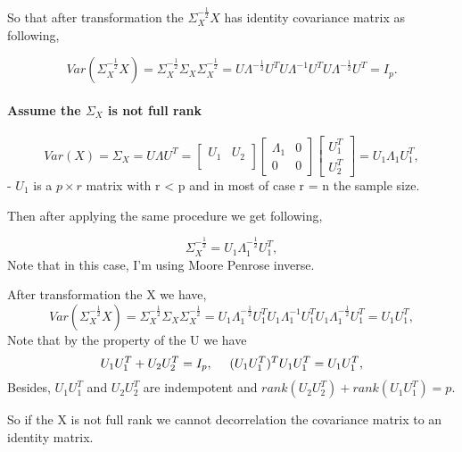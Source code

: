 \documentclass[]{article}
\let\oldparagraph\paragraph
\renewcommand{\paragraph}[1]{\oldparagraph{#1}\mbox{}}
\begin{document}
So that after transformation the \(\Sigma^{-\frac{1}{2}}_X X\) has
identity covariance matrix as following,

\[
  Var(\Sigma^{-\frac{1}{2}}_X X) = \Sigma^{-\frac{1}{2}}_X \Sigma_X\Sigma^{-\frac{1}{2}}_X = U\Lambda^{-\frac{1}{2}}U^T U\Lambda^{-1}U^T U\Lambda^{-\frac{1}{2}}U^T = I_p.
\]

\paragraph{\texorpdfstring{Assume the \(\Sigma_X\) is not full
rank}{Assume the \textbackslash{}Sigma\_X is not full rank}}\label{assume-the-sigma_x-is-not-full-rank}

\[
  Var(X) = \Sigma_X = U\Lambda U^T =
                        \begin{bmatrix}
                         U_1 & U_2\\
                        \end{bmatrix}
                        \begin{bmatrix}
                        \Lambda_1 & 0\\
                        0 & 0
                        \end{bmatrix}
                        \begin{bmatrix}
                        U_1^T \\
                        U_2^T
                        \end{bmatrix} = U_1\Lambda_1U_1^T,
\] - \(U_1\) is a \(p \times r\) matrix with r \textless{} p and in most
of case r = n the sample size.

Then after applying the same procedure we get following,

\[
  \Sigma^{-\frac{1}{2}}_X = U_1\Lambda_1^{-\frac{1}{2}}U_1^T,
\] Note that in this case, I'm using Moore Penrose inverse.

After transformation the X we have, \[
  Var(\Sigma^{-\frac{1}{2}}_X X) = \Sigma^{-\frac{1}{2}}_X \Sigma_X\Sigma^{-\frac{1}{2}}_X = U_1\Lambda^{-\frac{1}{2}}_1U^T_1 U_1\Lambda^{-1}_1U^T_1 U_1\Lambda^{-\frac{1}{2}}_1U^T_1 = U_1U_1^T,  
\] Note that by the property of the U we have \[
  U_1U_1^T + U_2U_2^T = I_p, ~~~~~\\
  (U_1U_1^T)^T U_1U_1^T = U_1U_1^T,
\] Besides, \(U_1U_1^T\) and \(U_2U_2^T\) are indempotent and
\(rank(U_2U_2^T) + rank(U_1U_1^T) = p\).

So if the X is not full rank we cannot decorrelation the covariance
matrix to an identity matrix.
\end{document}
